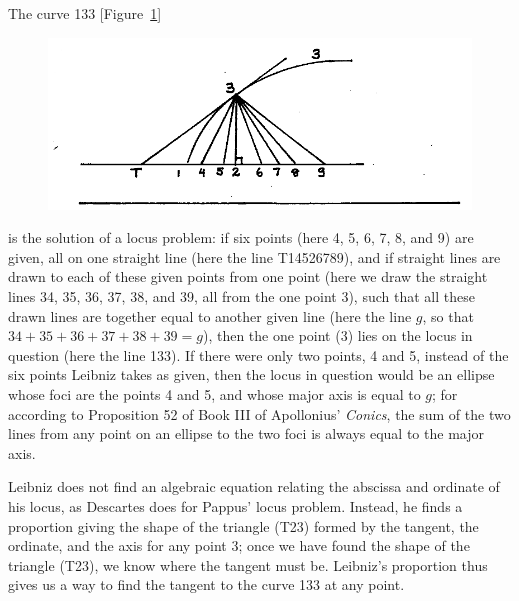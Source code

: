 \documentclass[polutonikogreek,english,twoside,openright]{article}
\begin{document}
The curve 133 [Figure~\ref{locus2}] 
\begin{figure}[htp]
\begin{center}
\includegraphics[width=\textwidth]{fig/Figure24}
\caption{}
\label{locus2}
\vspace{-10pt}
\end{center}
\end{figure}is the solution of a locus problem: if six points (here 4,
5, 6, 7, 8, and 9) are given, all on one straight line (here the line
T14526789), and if straight lines are drawn to each of these given
points from one point (here we draw the straight lines 34, 35, 36, 37,
38, and 39, all from the one point 3), such that all these drawn lines
are together equal to another given line (here the line $g$, so that
$34 + 35 + 36 + 37 + 38 + 39 = g$), then the one point (3) lies on the
locus in question (here the line 133).  If there were only two points,
4 and 5, instead of the six points Leibniz takes as given, then the
locus in question would be an ellipse whose foci are the points 4 and
5, and whose major axis is equal to $g$; for according to Proposition
52 of Book III of Apollonius' {\em Conics}, the sum of the two lines
from any point on an ellipse to the two foci is always equal to the
major axis.

Leibniz does not find an algebraic equation relating the abscissa and
ordinate of his locus, as Descartes does for Pappus' locus problem.
Instead, he finds a proportion giving the shape of the triangle (T23)
formed by the tangent, the ordinate, and the axis for any point 3;
once we have found the shape of the triangle (T23), we know where the
tangent must be.  Leibniz's proportion thus gives us a way to find the
tangent to the curve 133 at any point.
\end{document}
